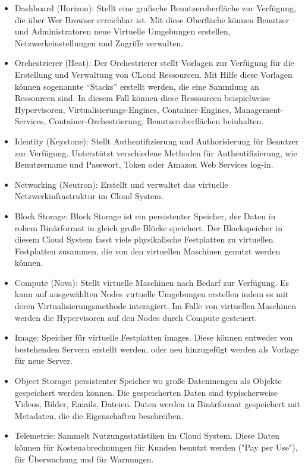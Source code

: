 \begin{itemize}
	\item Dashboard (Horizon): Stellt eine grafische Benutzeroberfläche zur Verfügung, die über Wer Browser erreichbar ist. Mit diese Oberfläche können Benutzer und Administratoren neue Virtuelle Umgebungen erstellen, Netzwerkeinstellungen und Zugriffe verwalten. 
	\item Orchestrierer (Heat): Der Orchestrierer stellt Vorlagen zur Verfügung für die Erstellung und Verwaltung von CLoud Ressourcen. Mit Hilfe diese Vorlagen können sogenannte \enquote{Stacks} erstellt werden, die eine Sammlung an Ressourcen sind. In diesem Fall können diese Ressourcen beispielweise Hypervisoren, Virtualisierungs-Engines, Container-Engines, Management-Services, Container-Orchestrierung, Benutzeroberflächen beinhalten. 
	\item Identity (Keystone): Stellt Authentifizierung und Authorisierung für Benutzer zur Verfügung. Unterstützt verschiedene Methoden für Authentifizierung, wie Benutzername und Passwort, Token oder Amazon Web Services log-in.
	\item Networking (Neutron): Erstellt und verwaltet das virtuelle Netzwerkinfrastruktur im Cloud System. 
	\item Block Storage: Block Storage ist ein persistenter Speicher, der Daten in rohem Binärformat in gleich große Blöcke speichert. Der Blockspeicher in diesem Cloud System fasst viele physikalische Festplatten zu virtuellen Festplatten zusammen, die von den virtuellen Maschinen genutzt werden können. 
	\item Compute (Nova): Stellt virtuelle Maschinen nach Bedarf zur Verfügung. Es kann auf ausgewählten Nodes virtuelle Umgebungen erstellen indem es mit deren Virtualisierungsmethode interagiert. Im Falle von virtuellen Maschinen werden die Hypervisoren auf den Nodes durch Compute gesteuert. 
	\item Image: Speicher für virtuelle Festplatten images. Diese können entweder von bestehenden Servern erstellt werden, oder neu hinzugefügt werden als Vorlage für neue Server. 
	\item Object Storage: persistenter Speicher wo große Datenmengen als Objekte gespeichert werden können. Die gespeicherten Daten sind typischerweise Videos, Bilder, Emails, Dateien. Daten werden in Binärformat gespeichert mit Metadaten, die die Eigenschaften beschreiben. 
	\item Telemetrie: Sammelt Nutzungsstatistiken im Cloud System. Diese Daten können für Kostenabrechnungen für Kunden benutzt werden ("Pay per Use"), für Überwachung und für Warnungen.
\end{itemize} \cite{Red2_2024}

